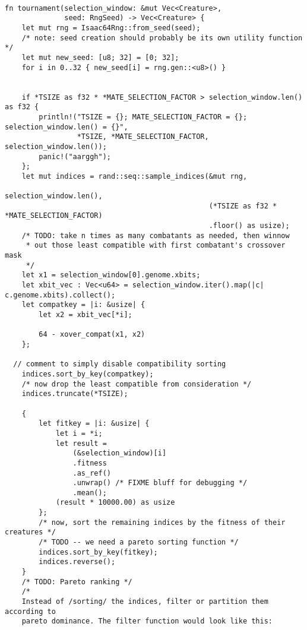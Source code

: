 \documentclass[11pt]{article}
\begin{document}
\lstset{language=rust,label=orgcc32756,caption= ,captionpos=b,numbers=none}
\begin{lstlisting}

fn tournament(selection_window: &mut Vec<Creature>,
              seed: RngSeed) -> Vec<Creature> {
    let mut rng = Isaac64Rng::from_seed(seed);
    /* note: seed creation should probably be its own utility function */
    let mut new_seed: [u8; 32] = [0; 32];
    for i in 0..32 { new_seed[i] = rng.gen::<u8>() }


    if *TSIZE as f32 * *MATE_SELECTION_FACTOR > selection_window.len() as f32 {
        println!("TSIZE = {}; MATE_SELECTION_FACTOR = {}; selection_window.len() = {}",
                 *TSIZE, *MATE_SELECTION_FACTOR, selection_window.len());
        panic!("aarggh");
    };
    let mut indices = rand::seq::sample_indices(&mut rng,
                                                selection_window.len(),
                                                (*TSIZE as f32 * *MATE_SELECTION_FACTOR)
                                                .floor() as usize);
    /* TODO: take n times as many combatants as needed, then winnow
     * out those least compatible with first combatant's crossover mask
     */
    let x1 = selection_window[0].genome.xbits;
    let xbit_vec : Vec<u64> = selection_window.iter().map(|c| c.genome.xbits).collect();
    let compatkey = |i: &usize| {
        let x2 = xbit_vec[*i];

        64 - xover_compat(x1, x2)
    };

  // comment to simply disable compatibility sorting
    indices.sort_by_key(compatkey);
    /* now drop the least compatible from consideration */
    indices.truncate(*TSIZE);

    {
        let fitkey = |i: &usize| {
            let i = *i;
            let result = 
                (&selection_window)[i]
                .fitness
                .as_ref()
                .unwrap() /* FIXME bluff for debugging */
                .mean();
            (result * 10000.00) as usize
        };
        /* now, sort the remaining indices by the fitness of their creatures */
        /* TODO -- we need a pareto sorting function */
        indices.sort_by_key(fitkey);
        indices.reverse();
    }
    /* TODO: Pareto ranking */
    /*
    Instead of /sorting/ the indices, filter or partition them according to
    pareto dominance. The filter function would look like this:


\end{lstlisting}
\end{document}
